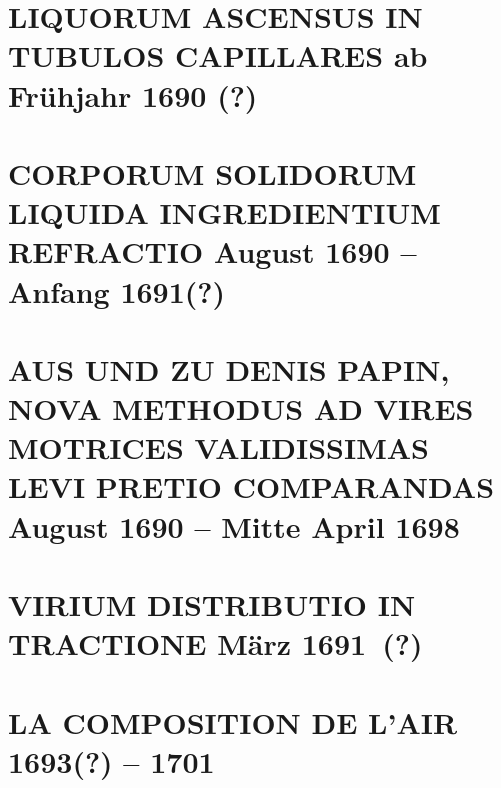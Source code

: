 \documentclass[%
fontsize=10pt,
]{scrbook}
\DeclareRobustCommand{\bracks}[1]{%
\textup{\lbrack}#1\textup{\rbrack}}
\begin{document}
\chapter[tocentry={Liquorum ascensus in tubulos capillares %
\enskip\lbrack%
ab Frühjahr 1690 (?)%
\rbrack}, %
head={Liquorum ascensus in tubulos capillares%
}]%
{\MakeUppercase{Liquorum ascensus in tubulos capillares} %
\newline\lbrack%
ab Frühjahr 1690 (?)%
\rbrack}%
\label{42488}




\chapter[tocentry={Corporum solidorum liquida ingredientium refractio %
\enskip%
\bracks{%
August
1690 -- Anfang 1691\;(?)}}, %
head={Corporum solidorum refractio%
}]%
{\MakeUppercase{Corporum solidorum liquida ingredientium refractio} %
\newline%
\bracks{%
August
1690 -- Anfang 1691\;(?)}%
} %
\label{58952}




\chapter[tocentry={Aus und zu Denis Papin, Nova methodus ad vires motrices validissimas levi pretio comparandas
\enskip%
\bracks{%
August
1690 -- Mitte April 1698}},
head={Aus und zu Denis Papin, Nova methodus
}]%
{\MakeUppercase{Aus und zu Denis Papin, Nova methodus ad vires motrices validissimas levi pretio comparandas}
\newline%
\bracks{%
August
1690 -- Mitte April 1698}}
\label{55804}




\chapter[tocentry={Virium distributio in tractione %
\enskip \lbrack März 1691~(?)\rbrack}, %
head={Virium distributio in tractione%
}]%
{\MakeUppercase{Virium distributio in tractione} %
\newline\lbrack März 1691~(?)\rbrack} %
\label{60117}




\chapter[tocentry={La composition de l'air
\enskip\bracks{%
1693\;(?) -- 1701%
}}, %
head={La composition de l'air%
}]%
{\MakeUppercase{La composition de l'air} %
\newline\bracks{%
1693\;(?) -- 1701%
}}%
\label{56214}

\end{document}

